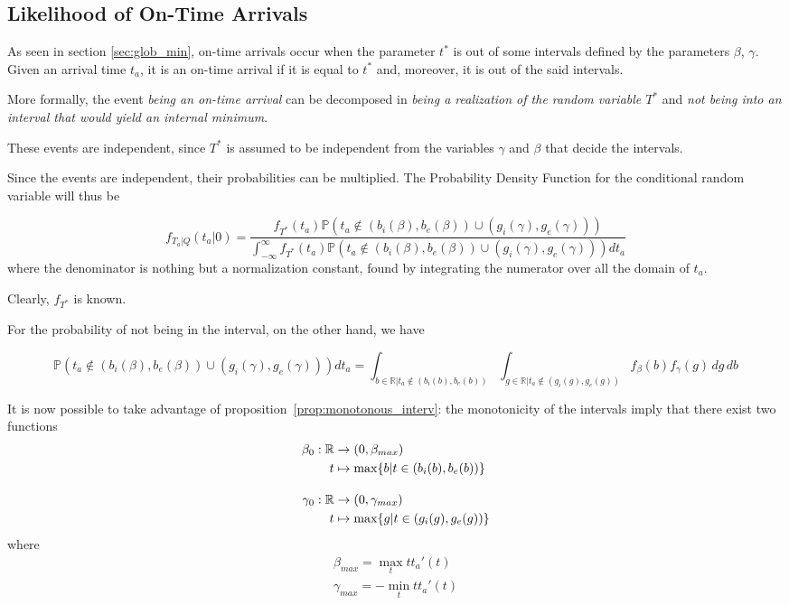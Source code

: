 \subsection{Likelihood of On-Time Arrivals}
\label{sec:lik_ot}

As seen in section \ref{sec:glob_min},
on-time arrivals occur when the parameter \(t^*\) is out of some intervals defined by the parameters \(\beta\), \(\gamma\).
Given an arrival time \(t_a\),
it is an on-time arrival if it is equal to \(t^*\) and, moreover, it is out of the said intervals.

More formally, the event \textit{being an on-time arrival} can be decomposed in \textit{being a realization of the random variable \(T^*\)} and \textit{not being into an interval that would yield an internal minimum}.

These events are independent, since \(T^*\) is assumed to be independent from the variables \(\gamma\) and \(\beta\) that decide the intervals.

Since the events are independent, their probabilities can be multiplied.
The Probability Density Function for the conditional random variable will thus be

\begin{equation}
  \label{eq:pdf_ot}
    f_{T_a | Q}(t_a | 0) = \frac{f_{T^*}(t_a)\mathbb{P}( t_a \not\in (b_i(\beta), b_e(\beta)) \cup (g_i(\gamma), g_e(\gamma)))}{\int_{-\infty}^\infty f_{T^*}(t_a)\mathbb{P}( t_a \not\in (b_i(\beta), b_e(\beta)) \cup (g_i(\gamma), g_e(\gamma)))dt_a}
\end{equation}
where the denominator is nothing but a normalization constant, found by integrating the numerator over all the domain of \(t_a\).

Clearly, \(f_{T^*}\) is known.

For the probability of not being in the interval, on the other hand, we have 

\begin{equation}
  \label{eq:prob_not_interv}
  \mathbb{P}( t_a \not\in (b_i(\beta), b_e(\beta)) \cup (g_i(\gamma), g_e(\gamma)))dt_a = \int_{b\in \mathbb{R} \vert t_a \not\in (b_i(b), b_e(b))}\int_{g \in \mathbb{R} \vert t_a \not\in (g_i(g), g_e(g))}f_\beta(b)f_\gamma(g)\, dg\, db
\end{equation}

It is now possible to take advantage of proposition~\ref{prop:monotonous_interv}:
the monotonicity of the intervals imply that there exist two functions
\begin{align*}
  \beta_0:\mathbb{R}&\rightarrow(0, \beta_{max}) \\
  t&\mapsto \max\{b | t \in (b_i(b), b_e(b))\} \\[1em]
  \gamma_0:\mathbb{R}&\rightarrow(0, \gamma_{max}) \\
  t&\mapsto \max\{g | t \in (g_i(g), g_e(g))\}
\end{align*}
where
\begin{align*}
  \beta_{max} = \max_t tt_a'(t) \\
  \gamma_{max} = -\min_t tt_a'(t)
\end{align*}

